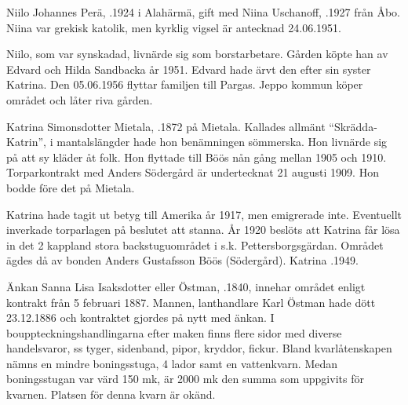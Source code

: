


Niilo Johannes Perä, .1924 i Alahärmä, gift med Niina Uschanoff, .1927 från Åbo. Niina var grekisk katolik, men kyrklig vigsel är antecknad 24.06.1951.
\begin{jhchildren}
  \item {}
  \item {}
  \item {}
\end{jhchildren}
Niilo, som var synskadad, livnärde sig som borstarbetare. Gården köpte han av Edvard och Hilda Sandbacka år 1951. Edvard hade ärvt den efter sin syster Katrina. Den 05.06.1956 flyttar familjen till Pargas. Jeppo kommun köper området och låter riva gården.


Katrina Simonsdotter Mietala, .1872 på Mietala. Kallades allmänt ``Skrädda-Katrin'', i mantalslängder hade hon benämningen sömmerska. Hon livnärde sig på att sy kläder åt folk. Hon flyttade till Böös nån gång mellan 1905 och 1910. Torparkontrakt med Anders Södergård är undertecknat 21 augusti 1909. Hon bodde före det på Mietala.

Katrina hade tagit ut betyg till Amerika år 1917, men emigrerade inte. Eventuellt inverkade torparlagen på beslutet att stanna. År 1920 beslöts att Katrina får lösa in det 2 kappland stora backstuguområdet i s.k. Pettersborgsgärdan. Området ägdes då av bonden Anders 				Gustafsson Böös (Södergård). Katrina .1949.


Änkan Sanna Lisa Isaksdotter eller Östman, .1840, innehar området enligt kontrakt från 5 februari 1887. Mannen, lanthandlare Karl Östman hade dött 23.12.1886 och kontraktet gjordes på nytt med änkan. I bouppteckningshandlingarna efter maken finns flere sidor med diverse handelsvaror, ss tyger, sidenband, pipor, kryddor, fickur. Bland kvarlåtenskapen nämns en mindre boningsstuga, 4 lador samt en vattenkvarn. Medan boningsstugan var värd 150 mk, är 2000 mk den summa som uppgivits för kvarnen. Platsen för denna kvarn är okänd.

